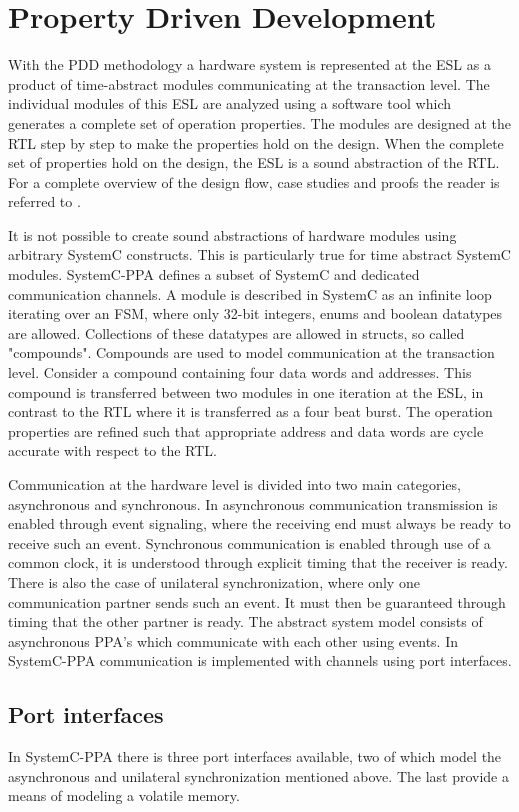 \section{Property Driven Development}
\label{sec:pdd}
With the PDD methodology a hardware system is represented at the ESL as a product of time-abstract modules communicating at the transaction level. The individual modules of this ESL are analyzed using a software tool \cite{descam} which generates a complete set of operation properties. The modules are designed at the RTL step by step to make the properties hold on the design. When the complete set of properties hold on the design, the ESL is a sound abstraction of the RTL. For a complete overview of the design flow, case studies and proofs the reader is referred to \cite{pddref}. \par
It is not possible to create sound abstractions of hardware modules using arbitrary SystemC constructs. This is particularly true for time abstract SystemC modules. SystemC-PPA defines a subset of SystemC and dedicated communication channels. A module is described in SystemC as an infinite loop iterating over an FSM, where only 32-bit integers, enums and boolean datatypes are allowed. Collections of these datatypes are allowed in structs, so called "compounds". Compounds are used to model communication at the transaction level. Consider a compound containing four data words and addresses. This compound is transferred between two modules in one iteration at the ESL, in contrast to the RTL where it is transferred as a four beat burst. The operation properties are refined such that appropriate address and data words are cycle accurate with respect to the RTL. \par
Communication at the hardware level is divided into two main categories, asynchronous and synchronous. In asynchronous communication transmission is enabled through event signaling, where the receiving end must always be ready to receive such an event. Synchronous communication is enabled through use of a common clock, it is understood through explicit timing that the receiver is ready. There is also the case of unilateral synchronization, where only one communication partner sends such an event. It must then be guaranteed through timing that the other partner is ready. The abstract system model consists of asynchronous PPA's which communicate with each other using events. In SystemC-PPA communication is implemented with channels using port interfaces.


\subsection{Port interfaces}
\label{sub:ports}       
In SystemC-PPA there is three port interfaces available, two of which model the asynchronous and unilateral synchronization mentioned above. The last provide a means of modeling a volatile memory. 

